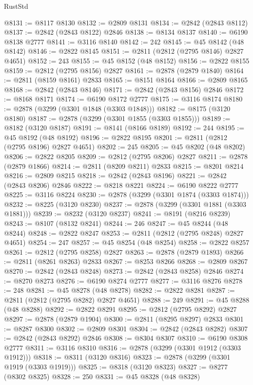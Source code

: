 \begin{lexlean}{RustStd}
\begin{coremodule}
{\begin{coremodule}
{{{{{{{{{{{{{{{{{{{{{{{{{{{{{{{{{@8131 := @8117 @8130
@8132 := @2809 @8131
@8134 := @2842 (@2843 @8112)
@8137 := @2842 (@2843 @8122) @2846
@8138 := @8134 @8137
@8140 := @6190 @8138 @2777
@8141 := @3116 @8140
@8142 := 242
@8145 := @45 @8142 (@48 @8142)
@8146 := @2822 @8145
@8151 := @2811 (@2812 (@2795 @8146) @2827 @4651)
@8152 := 243
@8155 := @45 @8152 (@48 @8152)
@8156 := @2822 @8155
@8159 := @2812 (@2795 @8156) @2827
@8161 := @2878 (@2879 @1840)
@8164 := @2811 (@8159 @8161) @2833
@8165 := @8151 @8164
@8166 := @2809 @8165
@8168 := @2842 (@2843 @8146)
@8171 := @2842 (@2843 @8156) @2846
@8172 := @8168 @8171
@8174 := @6190 @8172 @2777
@8175 := @3116 @8174
@8180 := @2878 (@3299 (@3301 @1848 (@3303 @1848)))
@8182 := @8175 (@3120 @8180)
@8187 := @2878 (@3299 (@3301 @1855 (@3303 @1855)))
@8189 := @8182 (@3120 @8187)
@8191 := @8141 (@8166 @8189)
@8192 := 244
@8195 := @45 @8192 (@48 @8192)
@8196 := @2822 @8195
@8201 := @2811 (@2812 (@2795 @8196) @2827 @4651)
@8202 := 245
@8205 := @45 @8202 (@48 @8202)
@8206 := @2822 @8205
@8209 := @2812 (@2795 @8206) @2827
@8211 := @2878 (@2879 @1866)
@8214 := @2811 (@8209 @8211) @2833
@8215 := @8201 @8214
@8216 := @2809 @8215
@8218 := @2842 (@2843 @8196)
@8221 := @2842 (@2843 @8206) @2846
@8222 := @8218 @8221
@8224 := @6190 @8222 @2777
@8225 := @3116 @8224
@8230 := @2878 (@3299 (@3301 @1874 (@3303 @1874)))
@8232 := @8225 (@3120 @8230)
@8237 := @2878 (@3299 (@3301 @1881 (@3303 @1881)))
@8239 := @8232 (@3120 @8237)
@8241 := @8191 (@8216 @8239)
@8243 := @8107 (@8132 @8241)
@8244 := 246
@8247 := @45 @8244 (@48 @8244)
@8248 := @2822 @8247
@8253 := @2811 (@2812 (@2795 @8248) @2827 @4651)
@8254 := 247
@8257 := @45 @8254 (@48 @8254)
@8258 := @2822 @8257
@8261 := @2812 (@2795 @8258) @2827
@8263 := @2878 (@2879 @1893)
@8266 := @2811 (@8261 @8263) @2833
@8267 := @8253 @8266
@8268 := @2809 @8267
@8270 := @2842 (@2843 @8248)
@8273 := @2842 (@2843 @8258) @2846
@8274 := @8270 @8273
@8276 := @6190 @8274 @2777
@8277 := @3116 @8276
@8278 := 248
@8281 := @45 @8278 (@48 @8278)
@8282 := @2822 @8281
@8287 := @2811 (@2812 (@2795 @8282) @2827 @4651)
@8288 := 249
@8291 := @45 @8288 (@48 @8288)
@8292 := @2822 @8291
@8295 := @2812 (@2795 @8292) @2827
@8297 := @2878 (@2879 @1904)
@8300 := @2811 (@8295 @8297) @2833
@8301 := @8287 @8300
@8302 := @2809 @8301
@8304 := @2842 (@2843 @8282)
@8307 := @2842 (@2843 @8292) @2846
@8308 := @8304 @8307
@8310 := @6190 @8308 @2777
@8311 := @3116 @8310
@8316 := @2878 (@3299 (@3301 @1912 (@3303 @1912)))
@8318 := @8311 (@3120 @8316)
@8323 := @2878 (@3299 (@3301 @1919 (@3303 @1919)))
@8325 := @8318 (@3120 @8323)
@8327 := @8277 (@8302 @8325)
@8328 := 250
@8331 := @45 @8328 (@48 @8328)
}}}}}}}}}}}}}}}}}}}}}}}}}}}}}}}}}
\end{coremodule}}
\end{coremodule}
\end{lexlean}
